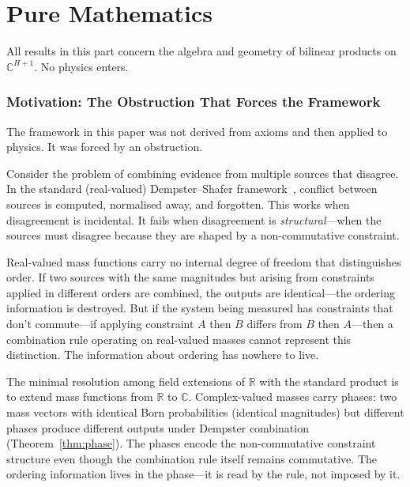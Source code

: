 \documentclass[11pt,a4paper]{article}
\theoremstyle{definition}
\theoremstyle{remark}
\newcommand{\C}{\mathbb{C}}
\newcommand{\R}{\mathbb{R}}
\begin{document}
\part{Pure Mathematics}\label{part:A}

All results in this part concern the algebra and geometry of bilinear products on $\C^{H+1}$. No physics enters.

\section{Motivation: The Obstruction That Forces the Framework}\label{sec:motivation}

The framework in this paper was not derived from axioms and then applied to physics. It was forced by an obstruction.

Consider the problem of combining evidence from multiple sources that disagree. In the standard (real-valued) Dempster--Shafer framework~\cite{Dempster1967,Shafer1976}, conflict between sources is computed, normalised away, and forgotten. This works when disagreement is incidental. It fails when disagreement is \emph{structural}---when the sources must disagree because they are shaped by a non-commutative constraint.

Real-valued mass functions carry no internal degree of freedom that distinguishes order. If two sources with the same magnitudes but arising from constraints applied in different orders are combined, the outputs are identical---the ordering information is destroyed. But if the system being measured has constraints that don't commute---if applying constraint $A$ then $B$ differs from $B$ then $A$---then a combination rule operating on real-valued masses cannot represent this distinction. The information about ordering has nowhere to live.

The minimal resolution among field extensions of $\R$ with the standard product is to extend mass functions from $\R$ to $\C$. Complex-valued masses carry phases: two mass vectors with identical Born probabilities (identical magnitudes) but different phases produce different outputs under Dempster combination (Theorem~\ref{thm:phase}). The phases encode the non-commutative constraint structure even though the combination rule itself remains commutative. The ordering information lives in the phase---it is read by the rule, not imposed by it.
\end{document}
